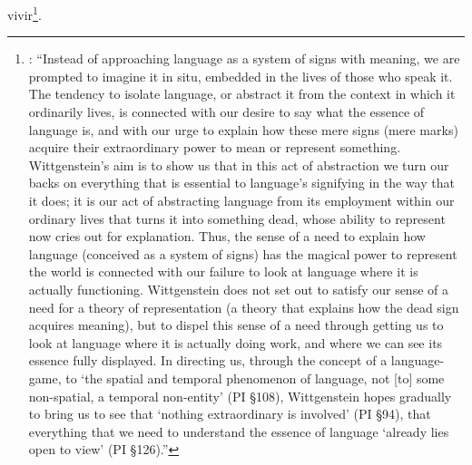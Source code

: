vivir\footnote{\cite[Cf.~][48]{mcginn2013guide}: \enquote{Instead of approaching language as a system of signs with meaning, we are prompted to imagine it in situ, embedded in the lives of those who speak it. The tendency to isolate language, or abstract it from the context in which it ordinarily lives, is connected with our desire to say what the essence of language is, and with our urge to explain how these mere signs (mere marks) acquire their extraordinary power to mean or represent something. Wittgenstein’s aim is to show us that in this act of abstraction we turn our backs on everything that is essential to language’s signifying in the way that it does; it is our act of abstracting language from its employment within our ordinary lives that turns it into something dead, whose ability to represent now cries out for explanation. Thus, the sense of a need to explain how language (conceived as a system of signs) has the magical power to represent the world is connected with our failure to look at language where it is actually functioning. Wittgenstein does not set out to satisfy our sense of a need for a theory of representation (a theory that explains how the dead sign acquires meaning), but to dispel this sense of a need through getting us to look at language where it is actually doing work, and where we can see its essence fully displayed. In directing us, through the concept of a language-game, to ‘the spatial and temporal phenomenon of language, not [to] some non-spatial, a temporal non-entity’ (PI §108), Wittgenstein hopes gradually to bring us to see that ‘nothing extraordinary is involved’ (PI §94), that everything that we need to understand the essence of language ‘already lies open to view’ (PI §126).}}.
